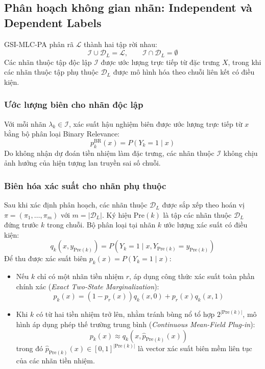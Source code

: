 \documentclass[11pt,a4paper]{article}
\begin{document}
\subsection{Phân hoạch không gian nhãn: Independent và Dependent Labels}
GSI-MLC-PA phân rã $\mathcal{L}$ thành hai tập rời nhau:
\begin{equation}
\mathcal{I} \cup \mathcal{D}_L = \mathcal{L}, \qquad \mathcal{I} \cap \mathcal{D}_L = \emptyset
\label{eq:partition_def}
\end{equation}
Các nhãn thuộc tập độc lập $\mathcal{I}$ được ước lượng trực tiếp từ đặc trưng $X$, trong khi các nhãn thuộc tập phụ thuộc $\mathcal{D}_L$ được mô hình hóa theo chuỗi liên kết có điều kiện.

\subsubsection{Ước lượng biên cho nhãn độc lập}
Với mỗi nhãn $\lambda_k \in \mathcal{I}$, xác suất hậu nghiệm biên được ước lượng trực tiếp từ $x$ bằng bộ phân loại Binary Relevance:
\begin{equation}
p_k^{\mathrm{BR}}(x) = P(Y_k = 1 \mid x)
\label{eq:br_estimator}
\end{equation}
Do không nhận dự đoán tiền nhiệm làm đặc trưng, các nhãn thuộc $\mathcal{I}$ không chịu ảnh hưởng của hiện tượng lan truyền sai số chuỗi.

\subsubsection{Biên hóa xác suất cho nhãn phụ thuộc}
Sau khi xác định phân hoạch, các nhãn thuộc $\mathcal{D}_L$ được sắp xếp theo hoán vị $\pi = (\pi_1, \dots, \pi_m)$ với $m = |\mathcal{D}_L|$. Ký hiệu $\mathrm{Pre}(k)$ là tập các nhãn thuộc $\mathcal{D}_L$ đứng trước $k$ trong chuỗi. Bộ phân loại tại nhãn $k$ ước lượng xác suất có điều kiện:
\begin{equation}
q_k(x, y_{\mathrm{Pre}(k)}) = P(Y_k = 1 \mid x, Y_{\mathrm{Pre}(k)} = y_{\mathrm{Pre}(k)})
\end{equation}
Để thu được xác suất biên $p_k(x) = P(Y_k = 1 \mid x)$:
\begin{itemize}
    \item Nếu $k$ chỉ có một nhãn tiền nhiệm $r$, áp dụng công thức xác suất toàn phần chính xác (\textit{Exact Two-State Marginalization}):
    \begin{equation}
    p_k(x) = (1 - p_r(x)) q_k(x, 0) + p_r(x) q_k(x, 1)
    \label{eq:exact_two_state}
    \end{equation}
    \item Khi $k$ có từ hai tiền nhiệm trở lên, nhằm tránh bùng nổ tổ hợp $2^{|\mathrm{Pre}(k)|}$, mô hình áp dụng phép thế trường trung bình (\textit{Continuous Mean-Field Plug-in}):
    \begin{equation}
    p_k(x) \approx q_k(x, \hat{p}_{\mathrm{Pre}(k)}(x))
    \label{eq:mean_field_soft}
    \end{equation}
    trong đó $\hat{p}_{\mathrm{Pre}(k)}(x) \in [0, 1]^{|\mathrm{Pre}(k)|}$ là vector xác suất biên mềm liên tục của các nhãn tiền nhiệm.
\end{itemize}
\end{document}

